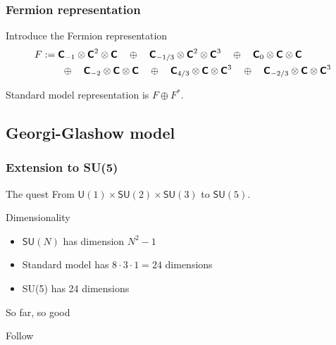 \documentclass[english, fleqn]{beamer}
\begin{document}
\begin{frame}
    \frametitle{Fermion representation}

    Introduce the Fermion representation
    \begin{align*}
        F &:= 
        \text{\bfseries\sffamily{C}}_{-1} \otimes \text{\bfseries\sffamily{C}}^2 \otimes \text{\bfseries\sffamily{C}}
        \quad\oplus\quad \text{\bfseries\sffamily{C}}_{-1/3} \otimes \text{\bfseries\sffamily{C}}^2 \otimes \text{\bfseries\sffamily{C}}^3
        \quad\oplus\quad \text{\bfseries\sffamily{C}}_{0} \otimes \text{\bfseries\sffamily{C}} \otimes \text{\bfseries\sffamily{C}}
        \\&\qquad\oplus\quad \text{\bfseries\sffamily{C}}_{-2} \otimes \text{\bfseries\sffamily{C}} \otimes \text{\bfseries\sffamily{C}}
        \quad\oplus\quad \text{\bfseries\sffamily{C}}_{4/3} \otimes \text{\bfseries\sffamily{C}} \otimes \text{\bfseries\sffamily{C}}^3
        \quad\oplus\quad \text{\bfseries\sffamily{C}}_{-2/3} \otimes \text{\bfseries\sffamily{C}} \otimes \text{\bfseries\sffamily{C}}^3
    \end{align*}

    \pause

    Standard model representation is $F \oplus F^*$.
\end{frame}

\subsection{Georgi-Glashow model}

\begin{frame}
    \frametitle{Extension to SU(5)}
    \begin{block}{The quest}
        From $\mathsf{U}(1) \times \mathsf{SU}(2) \times \mathsf{SU}(3)$ to $\mathsf{SU}(5)$.
    \end{block}

    \begin{block}{Dimensionality}
        \begin{itemize}
            \item $\mathsf{SU}(N)$ has dimension $N^2 - 1$
            \item Standard model has $8 \cdot 3 \cdot 1 = 24$ dimensions
            \item SU(5) has 24 dimensions
        \end{itemize}

        So far, so good

        Follow 
    \end{block}
\end{frame}
\end{document}
